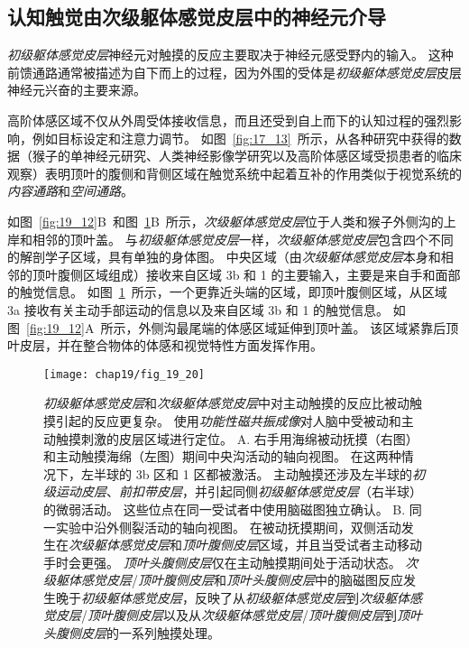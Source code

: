 \subsection{认知触觉由次级躯体感觉皮层中的神经元介导}

\textit{初级躯体感觉皮层}神经元对触摸的反应主要取决于神经元感受野内的输入。
这种前馈通路通常被描述为自下而上的过程，因为外围的受体是\textit{初级躯体感觉皮层}皮层神经元兴奋的主要来源。


高阶体感区域不仅从外周受体接收信息，而且还受到自上而下的认知过程的强烈影响，例如目标设定和注意力调节。
如图~\ref{fig:17_13}~所示，从各种研究中获得的数据（猴子的单神经元研究、人类神经影像学研究以及高阶体感区域受损患者的临床观察）表明顶叶的腹侧和背侧区域在触觉系统中起着互补的作用类似于视觉系统的\textit{内容通路}和\textit{空间通路}。


如图~\ref{fig:19_12}B~和图~\ref{fig:19_20}B~所示，\textit{次级躯体感觉皮层}位于人类和猴子外侧沟的上岸和相邻的顶叶盖。
与\textit{初级躯体感觉皮层}一样，\textit{次级躯体感觉皮层}包含四个不同的解剖学子区域，具有单独的身体图。
中央区域（由\textit{次级躯体感觉皮层}本身和相邻的顶叶腹侧区域组成）接收来自区域 3b 和 1 的主要输入，主要是来自手和面部的触觉信息。
如图~\ref{fig:19_20}~所示，一个更靠近头端的区域，即顶叶腹侧区域，从区域 3a 接收有关主动手部运动的信息以及来自区域 3b 和 1 的触觉信息。
如图~\ref{fig:19_12}A~所示，外侧沟最尾端的体感区域延伸到顶叶盖。
该区域紧靠后顶叶皮层，并在整合物体的体感和视觉特性方面发挥作用。


\begin{figure}[htbp]
	\centering
	\texttt{[image: chap19/fig\_19\_20]}
	\caption{\textit{初级躯体感觉皮层}和\textit{次级躯体感觉皮层}中对主动触摸的反应比被动触摸引起的反应更复杂。
		使用\textit{功能性磁共振成像}对人脑中受被动和主动触摸刺激的皮层区域进行定位\cite{hinkley2007sensorimotor}。
		A. 右手用海绵被动抚摸（右图）和主动触摸海绵（左图）期间中央沟活动的轴向视图。 在这两种情况下，左半球的 3b 区和 1 区都被激活。
		主动触摸还涉及左半球的\textit{初级运动皮层}、\textit{前扣带皮层}，并引起同侧\textit{初级躯体感觉皮层}（右半球）的微弱活动。
		这些位点在同一受试者中使用脑磁图独立确认。
		B. 同一实验中沿外侧裂活动的轴向视图。
		在被动抚摸期间，双侧活动发生在\textit{次级躯体感觉皮层}和\textit{顶叶腹侧皮层}区域，并且当受试者主动移动手时会更强。
		\textit{顶叶头腹侧皮层}仅在主动触摸期间处于活动状态。
		\textit{次级躯体感觉皮层}/\textit{顶叶腹侧皮层}和\textit{顶叶头腹侧皮层}中的脑磁图反应发生晚于\textit{初级躯体感觉皮层}，反映了从\textit{初级躯体感觉皮层}到\textit{次级躯体感觉皮层}/\textit{顶叶腹侧皮层}以及从\textit{次级躯体感觉皮层}/\textit{顶叶腹侧皮层}到\textit{顶叶头腹侧皮层}的一系列触摸处理。}
	\label{fig:19_20}
\end{figure}


